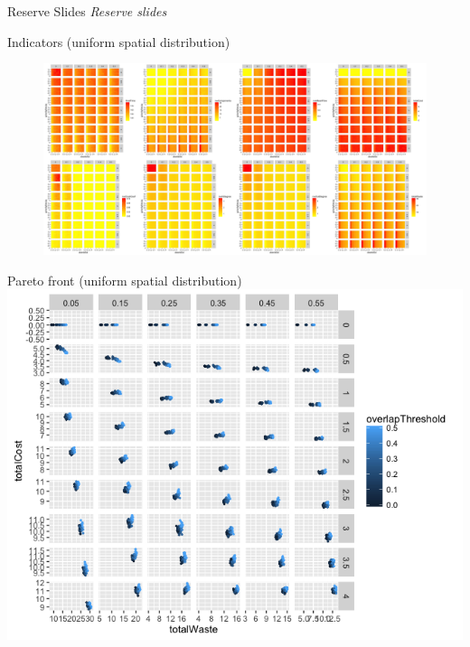 \documentclass{beamer}
\begin{document}



\begin{frame}{Reserve Slides}
  \Huge \centering \textit{Reserve slides}
\end{frame}



\begin{frame}{Indicators (uniform spatial distribution)}
\begin{figure}
\includegraphics[width=\textwidth]{figures/heatmap_indics}
\end{figure}
\end{frame}


\begin{frame}{Pareto front (uniform spatial distribution)}
\includegraphics[width=\textwidth]{figures/pareto_wasteCost_overlapThreshold}
\end{frame}
\end{document}
